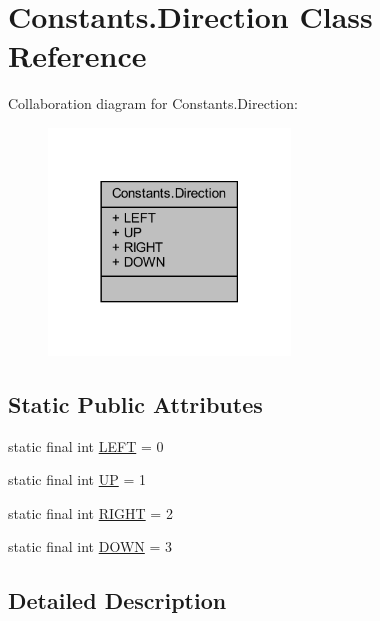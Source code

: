 \hypertarget{classhelpz_1_1_constants_1_1_direction}{}\section{Constants.\+Direction Class Reference}
\label{classhelpz_1_1_constants_1_1_direction}


Collaboration diagram for Constants.\+Direction\+:\nopagebreak
\begin{figure}[H]
\begin{center}
\leavevmode
\includegraphics[width=182pt]{classhelpz_1_1_constants_1_1_direction__coll__graph}
\end{center}
\end{figure}
\subsection*{Static Public Attributes}
\begin{DoxyCompactItemize}
\item 
static final int \hyperlink{classhelpz_1_1_constants_1_1_direction_a8f5895cd15bc59e07a2c1e4d55449333}{L\+E\+FT} = 0
\item 
static final int \hyperlink{classhelpz_1_1_constants_1_1_direction_ad6535a3a47426014d15edf19175a7293}{UP} = 1
\item 
static final int \hyperlink{classhelpz_1_1_constants_1_1_direction_ae432a3ecfa87c4a57b4143a165ddd72e}{R\+I\+G\+HT} = 2
\item 
static final int \hyperlink{classhelpz_1_1_constants_1_1_direction_aa9a430bba08262217c6e4f8613fedd9e}{D\+O\+WN} = 3
\end{DoxyCompactItemize}


\subsection{Detailed Description}


